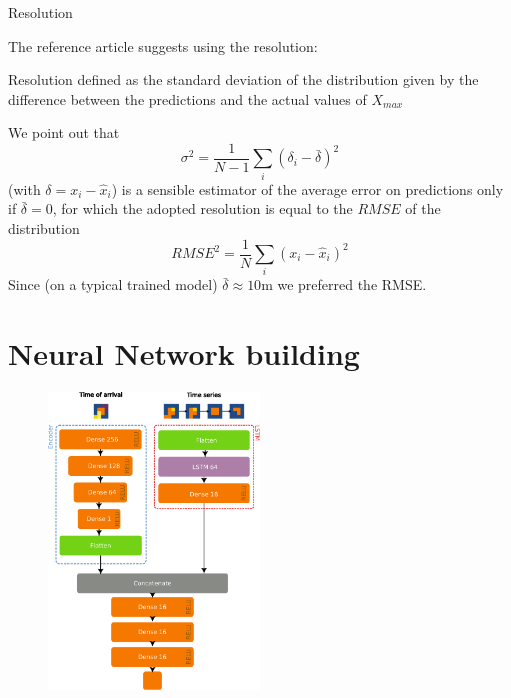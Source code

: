 \documentclass{beamer}
\begin{document}

\begin{frame}{Resolution}

    The reference article suggests using the resolution:
    \begin{block}{Resolution}
        defined as the standard deviation of the distribution given by the difference between the predictions and the actual values of $X_{max}$
    \end{block}

    We point out that 
    \[\sigma^2 = \frac{1}{N-1}\sum_i (\delta_i - \bar{\delta})^2\]
    (with $\delta=x_i - \hat{x}_i$) is a sensible estimator of the average error on predictions only if $\bar{\delta} = 0$, for which the adopted resolution is equal 
    to the $RMSE$ of the distribution
    \[ RMSE^2 = \frac{1}{N}\sum_i(x_i - \hat{x}_i)^2 \]
    Since (on a typical trained model) $\bar{\delta} \approx 10$m we preferred the RMSE.
\end{frame}



\section{Neural Network building}

\begin{frame}

    \begin{figure}
        \centering
        \includegraphics[width=0.5\textwidth]{figures/model.pdf}
    \end{figure}

\end{frame}
\end{document}
